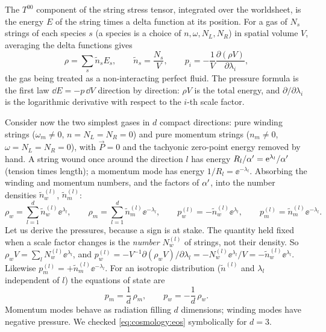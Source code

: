 The $T^{00}$ component of the string stress tensor, integrated over the worldsheet, is the
energy $E$ of the string times a delta function at its position.  For a gas of $N_s$ strings of each species $s$ (a species is a
choice of $n,\omega,N_L,N_R$) in spatial volume $V$, averaging the delta functions gives
\begin{equation}\label{eq:cosmology:rhop}
 \rho=\sum_s\tilde n_sE_s,\qquad \tilde n_s=\frac{N_s}{V},\qquad
 p_i=-\frac1V\frac{\partial(\rho V)}{\partial\lambda_i},
\end{equation}
the gas being treated as a non-interacting perfect fluid. The pressure formula is the
first law $\dd E=-p\,\dd V$ direction by direction: $\rho V$ is the total energy, and
$\partial/\partial\lambda_i$ is the logarithmic derivative with respect to the $i$-th
scale factor.

Consider now the two simplest gases in $d$ compact directions: pure winding strings
($\omega_m\ne0$, $n=N_L=N_R=0$) and pure momentum strings ($n_m\ne0$,
$\omega=N_L=N_R=0$), with $\vec P=0$ and the tachyonic zero-point energy removed by hand.
A string wound once around the direction $l$ has energy $R_l/\alpha'=\mathrm{e}^{\lambda_l}/\alpha'$
(tension times length); a momentum mode has energy $1/R_l=\ee^{-\lambda_l}$. Absorbing the
winding and momentum numbers, and the factors of $\alpha'$, into the number densities
$\tilde n_w^{(l)}$, $\tilde n_m^{(l)}$: 
\begin{equation}\label{eq:cosmology:rhowm}
 \rho_w=\sum_{l=1}^d\tilde n_w^{(l)}\ee^{\lambda_l},\qquad
 \rho_m=\sum_{l=1}^d\tilde n_m^{(l)}\ee^{-\lambda_l},\qquad
 p_w^{(l)}=-\tilde n_w^{(l)}\ee^{\lambda_l},\qquad
 p_m^{(l)}=\tilde n_m^{(l)}\ee^{-\lambda_l}.
\end{equation}
Let us derive the pressures, because a sign is at stake. The quantity held fixed when a
scale factor changes is the \emph{number} $N_w^{(l)}$ of strings, not their density. So
$\rho_wV=\sum_lN_w^{(l)}\ee^{\lambda_l}$, and
$p_w^{(l)}=-V^{-1}\partial(\rho_wV)/\partial\lambda_l=-N_w^{(l)}\ee^{\lambda_l}/V=-\tilde n_w^{(l)}\ee^{\lambda_l}$.
Likewise $p_m^{(l)}=+\tilde n_m^{(l)}\ee^{-\lambda_l}$. For an isotropic distribution
($\tilde n^{(l)}$ and $\lambda_l$ independent of $l$) the equations of state are
\begin{equation}\label{eq:cosmology:eos}
 p_m=\frac1d\,\rho_m,\qquad p_w=-\frac1d\,\rho_w .
\end{equation}
Momentum modes behave as radiation filling $d$ dimensions; winding modes have negative
pressure. We checked \eqref{eq:cosmology:eos} symbolically for $d=3$.

